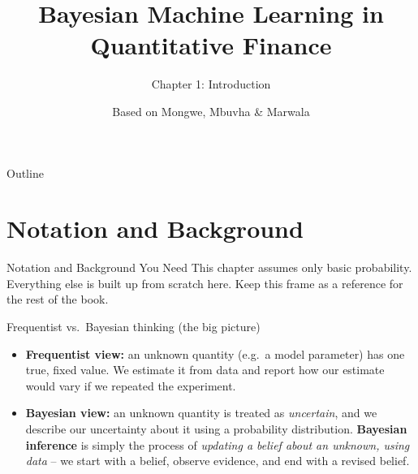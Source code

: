 \documentclass[aspectratio=169,10pt]{beamer}
\title[Bayesian ML in QF -- Ch.1]{Bayesian Machine Learning in Quantitative Finance}
\subtitle{Chapter 1: Introduction}
\author{Based on Mongwe, Mbuvha \& Marwala}
\date{}
\begin{document}

\begin{frame}
  \titlepage
\end{frame}

\begin{frame}{Outline}
  \tableofcontents
\end{frame}

\section{Notation and Background}

\begin{frame}[allowframebreaks]{Notation and Background You Need}
  This chapter assumes only basic probability. Everything else is built up
  from scratch here. Keep this frame as a reference for the rest of the book.

  \begin{block}{Frequentist vs.\ Bayesian thinking (the big picture)}
    \begin{itemize}
      \item \textbf{Frequentist view:} an unknown quantity (e.g.\ a model
      parameter) has one true, fixed value. We estimate it from data and
      report how our estimate would vary if we repeated the experiment.
      \item \textbf{Bayesian view:} an unknown quantity is treated as
      \emph{uncertain}, and we describe our uncertainty about it using a
      probability distribution. \textbf{Bayesian inference} is simply the
      process of \emph{updating a belief about an unknown, using data} --
      we start with a belief, observe evidence, and end with a revised
      belief.
    \end{itemize}
  \end{block}

  \framebreak


\end{frame}
\end{document}
